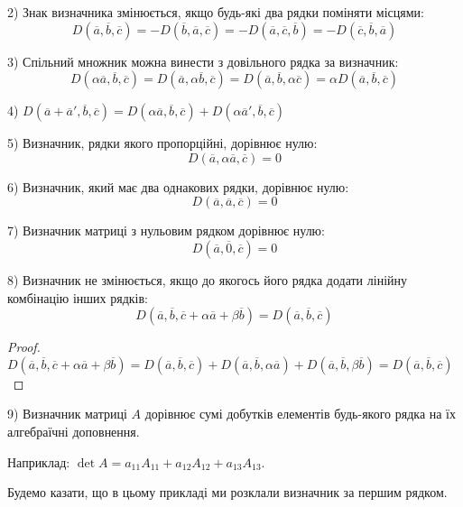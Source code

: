 2) Знак визначника змінюється, якщо будь-які два рядки поміняти місцями:
$$D(\overline{a}, \overline{b}, \overline{c}) = -D(\overline{b}, \overline{a}, \overline{c}) = -D(\overline{a}, \overline{c}, \overline{b}) = -D(\overline{c}, \overline{b}, \overline{a})$$

3) Спільний множник можна винести з довільного рядка за визначник:
$$D(\alpha\overline{a}, \overline{b}, \overline{c}) = D(\overline{a}, \alpha\overline{b}, \overline{c}) = D(\overline{a}, \overline{b}, \alpha\overline{c}) = \alpha D(\overline{a}, \overline{b}, \overline{c})$$

4) $D(\overline{a} + \overline{a}', \overline{b}, \overline{c}) = D(\alpha\overline{a}, \overline{b}, \overline{c}) + D(\alpha\overline{a}', \overline{b}, \overline{c})$

5) Визначник, рядки якого пропорційні, дорівнює нулю: 
$$D(\overline{a}, \alpha\overline{a}, \overline{c}) = 0$$

6) Визначник, який має два однакових рядки, дорівнює нулю: 
$$D(\overline{a}, \overline{a}, \overline{c}) = 0$$
	
7) Визначник матриці з нульовим рядком дорівнює нулю: 
$$D(\overline{a}, \overline{0}, \overline{c}) = 0$$	
	
8) Визначник не змінюється, якщо до якогось його рядка додати лінійну
комбінацію інших рядків:
$$D(\overline{a}, \overline{b}, \overline{c} + \alpha\overline{a} + \beta\overline{b})
= D(\overline{a}, \overline{b}, \overline{c})$$
	
\begin{proof}
	$D(\overline{a}, \overline{b}, \overline{c} + \alpha\overline{a} + \beta\overline{b}) = D(\overline{a}, \overline{b}, \overline{c}) + D(\overline{a}, \overline{b}, \alpha\overline{a}) + D(\overline{a}, \overline{b}, \beta\overline{b}) = D(\overline{a}, \overline{b}, \overline{c})$
\end{proof}
	
9) Визначник матриці $A$ дорівнює сумі добутків елементів будь-якого рядка на їх
алгебраїчні доповнення. 
	
Наприклад: $\det A = a_{11}A_{11} + a_{12}A_{12} + a_{13}A_{13}$.

Будемо казати, що в цьому прикладі ми розклали визначник за першим рядком.

